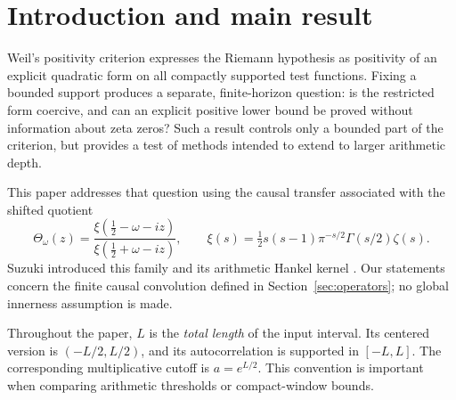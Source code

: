 \documentclass[11pt]{article}
\numberwithin{equation}{section}
\theoremstyle{definition}
\theoremstyle{remark}
\begin{document}
\section{Introduction and main result}

Weil's positivity criterion expresses the Riemann hypothesis as positivity of
an explicit quadratic form on all compactly supported test functions. Fixing
a bounded support produces a separate, finite-horizon question: is the
restricted form coercive, and can an explicit positive lower bound be proved
without information about zeta zeros? Such a result controls only a bounded
part of the criterion, but provides a test of methods intended to extend to
larger arithmetic depth.

This paper addresses that question using the causal transfer associated with
the shifted quotient
\begin{equation}\label{eq:theta}
 \Theta_\omega(z)=
 \frac{\xi(\tfrac12-\omega-iz)}{\xi(\tfrac12+\omega-iz)},\qquad
 \xi(s)=\tfrac12s(s-1)\pi^{-s/2}\Gamma(s/2)\zeta(s).
\end{equation}
Suzuki introduced this family and its arithmetic Hankel kernel
\cite{Suzuki2016}. Our statements concern the finite causal convolution
defined in Section~\ref{sec:operators}; no global innerness assumption is made.

Throughout the paper, $L$ is the \emph{total length} of the input interval.
Its centered version is $(-L/2,L/2)$, and its autocorrelation is supported
in $[-L,L]$. The corresponding multiplicative cutoff is $a=e^{L/2}$.
This convention is important when comparing arithmetic thresholds or
compact-window bounds.
\end{document}
